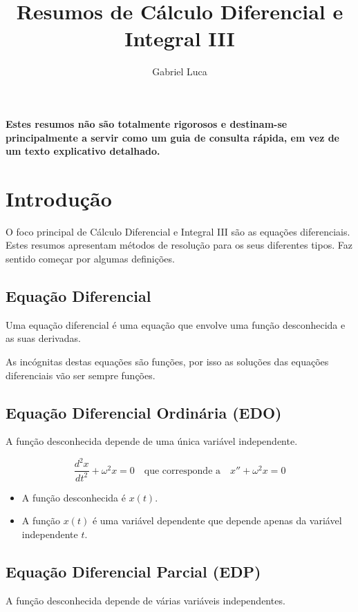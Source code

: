 \documentclass{article}
\title{Resumos de Cálculo Diferencial e Integral III}
\author{Gabriel Luca}
\date{}
\begin{document}
\maketitle
\vspace*{\fill}
\textbf{Estes resumos não são totalmente rigorosos e destinam-se principalmente a servir como
um guia de consulta rápida, em vez de um texto explicativo detalhado.}
\bigskip


\newpage


\renewcommand{\contentsname}{Índice}
\renewcommand{\figurename}{Figura}
\tableofcontents


\newpage


\section{Introdução}
O foco principal de Cálculo Diferencial e Integral III são as equações diferenciais.
Estes resumos apresentam métodos de resolução para os seus diferentes tipos.
Faz sentido começar por algumas definições.

\subsection{Equação Diferencial}
Uma equação diferencial é uma equação que envolve uma função desconhecida e as suas derivadas.

As incógnitas destas equações são funções, por isso
as soluções das equações diferenciais vão ser sempre funções.

\subsection{Equação Diferencial Ordinária (EDO)}
A função desconhecida depende de uma única variável independente.

$$
\frac{d^2 x}{dt^2} + \omega^2 x = 0 \quad \text{que corresponde a} \quad x'' + \omega^2 x = 0
$$

\begin{itemize}
    \item A função desconhecida é $x(t)$.
    \item A função $x(t)$ é uma variável dependente que depende apenas da variável independente $t$.
\end{itemize}

\subsection{Equação Diferencial Parcial (EDP)}
A função desconhecida depende de várias variáveis independentes.
\end{document}
